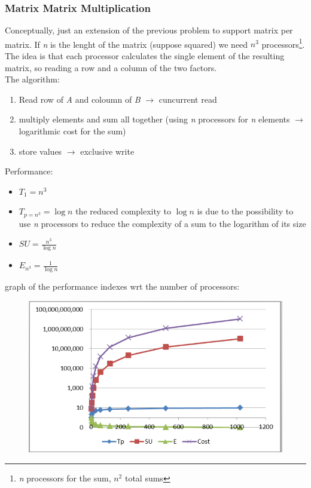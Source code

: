 \documentclass{article}
\begin{document}
			\subsubsection{Matrix Matrix Multiplication}
				Conceptually, just an extension of the previous problem to support matrix per matrix. If \emph{n} is the lenght of the matrix (suppose squared) we need $n^3$ processors\footnote{\emph{n} processors for the sum, $n^2$ total sums}. The idea is that each processor calculates the single element of the resulting matrix, so reading a row and a column of the two factors.\\
				The algorithm:
				\begin{enumerate}
					\item Read row of \emph{A} and coloumn of \emph{B} $\rightarrow$ cuncurrent read
					\item multiply elements and sum all together (using \emph{n} processors for \emph{n} elements $\rightarrow$ logarithmic cost for the sum)
					\item store values $\rightarrow$ exclusive write
				\end{enumerate}
				Performance:
				\begin{itemize}
					\item $T_1=n^3$
					\item $T_{p = n^3} = \log n$ the reduced complexity to $\log n$ is due to the possibility to use \emph{n} processors to reduce the complexity of a sum to the logarithm of its size
					\item $SU = \frac{n^3}{\log n}$
					\item $E_{n^3} = \frac{1}{\log n}$
				\end{itemize}
				graph of the performance indexes wrt the number of processors:
				\begin{figure}[H]
					\centering
					\includegraphics[width = \textwidth]{./images/perf1.png}
				\end{figure}
\end{document}
